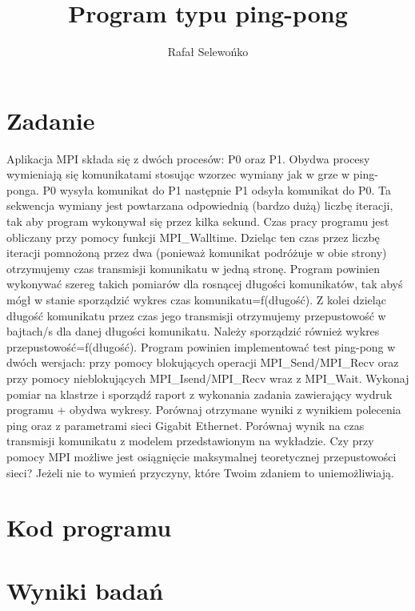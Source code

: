 \documentclass[a4paper,12pt]{article}
\title{Program typu ping-pong}
\author{Rafał Selewońko}
\begin{document}
\maketitle
 
\section{Zadanie}\label{sec:zadanie}
Aplikacja MPI składa się z dwóch procesów: P0 oraz P1. Obydwa procesy 
wymieniają się komunikatami stosując wzorzec wymiany jak w grze w ping-ponga. P0 wysyła 
komunikat do P1 następnie P1 odsyła komunikat do P0. Ta sekwencja wymiany jest powtarzana 
odpowiednią (bardzo dużą) liczbę iteracji, tak aby program wykonywał się przez kilka sekund. Czas 
pracy programu jest obliczany przy pomocy funkcji MPI\_Walltime. Dzieląc ten czas przez liczbę 
iteracji pomnożoną przez dwa (ponieważ komunikat podróżuje w obie strony) otrzymujemy czas 
transmisji komunikatu w jedną stronę. Program powinien wykonywać szereg takich pomiarów dla 
rosnącej długości komunikatów, tak abyś mógł w stanie sporządzić wykres 
czas komunikatu=f(długość). Z kolei dzieląc długość komunikatu przez czas jego transmisji otrzymujemy przepustowość w bajtach/s 
dla danej długości komunikatu. Należy sporządzić również wykres przepustowość=f(długość). 
Program powinien implementować test ping-pong w dwóch wersjach: przy pomocy blokujących 
operacji MPI\_Send/MPI\_Recv oraz przy pomocy nieblokujących MPI\_Isend/MPI\_Recv wraz z 
MPI\_Wait. Wykonaj pomiar na klastrze i sporządź raport z wykonania zadania zawierający wydruk 
programu + obydwa wykresy. Porównaj otrzymane wyniki z wynikiem polecenia ping oraz z 
parametrami sieci Gigabit Ethernet. Porównaj wynik na czas transmisji komunikatu z modelem 
przedstawionym na wykładzie. Czy przy pomocy MPI możliwe jest osiągnięcie maksymalnej 
teoretycznej przepustowości sieci? Jeżeli nie to wymień przyczyny, które Twoim zdaniem to 
uniemożliwiają.
 
\section{Kod programu}\label{sec:kod}



\section{Wyniki badań}
\end{document}
